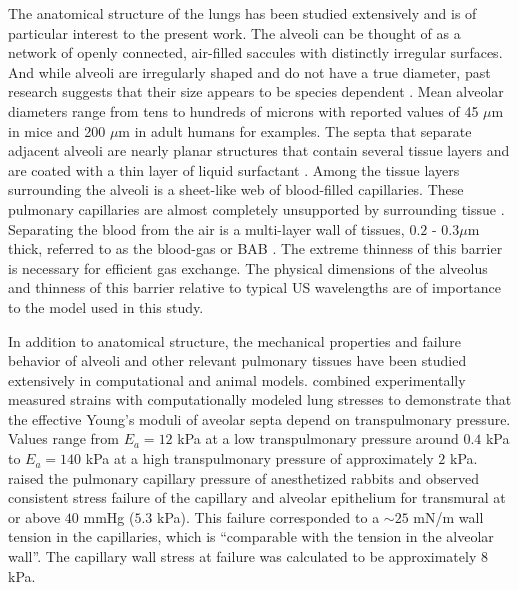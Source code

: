 The anatomical structure of the lungs has been studied extensively and
is of particular interest to the present work. The alveoli can be
thought of as a network of openly connected, air-filled saccules with
distinctly irregular surfaces. And while alveoli are irregularly
shaped and do not have a true diameter, past research suggests that
their size appears to be species dependent \citep{Faffe2002}. Mean
alveolar diameters range from tens to hundreds of microns with
reported values of 45 $\mu$m in mice \cite{Knust2008} and 200 $\mu$m
in adult humans \cite{Ochs2004} for examples. The septa that separate
adjacent alveoli are nearly planar structures that contain several
tissue layers and are coated with a thin layer of liquid surfactant
\citep{Gil1979,Reifenrath1975,Perlman2014}. Among the tissue layers
surrounding the alveoli is a sheet-like web of blood-filled
capillaries. These pulmonary capillaries are almost completely
unsupported by surrounding tissue \cite{West1991}. Separating the
blood from the air is a multi-layer wall of tissues, $0.2$ - $0.3\mu$m
thick, referred to as the blood-gas or \ac{BAB} \citep{West2000}. The
extreme thinness of this barrier is necessary for efficient gas
exchange. The physical dimensions of the alveolus and thinness of this
barrier relative to typical \ac{US} wavelengths are of importance to
the model used in this study.

In addition to anatomical structure, the mechanical properties and
failure behavior of alveoli and other relevant pulmonary tissues have
been studied extensively in computational and animal
models. \cite{Perlman2014} combined experimentally measured strains
with computationally modeled lung stresses to demonstrate that the
effective Young's moduli of aveolar septa depend on transpulmonary
pressure. Values range from $E_a=12$ kPa at a low transpulmonary
pressure around $0.4$ kPa to $E_a=140$ kPa at a high transpulmonary
pressure of approximately $2$ kPa. \cite{West1991} raised the
pulmonary capillary pressure of anesthetized rabbits and observed
consistent stress failure of the capillary and alveolar epithelium for
transmural at or above $40$ mmHg ($5.3$ kPa). This failure
corresponded to a $\sim25$ mN/m wall tension in the capillaries, which
is ``comparable with the tension in the alveolar wall''. The capillary
wall stress at failure was calculated to be approximately $8$
kPa. 

